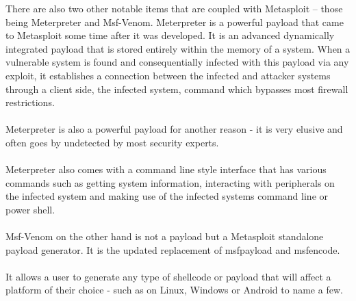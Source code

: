 \documentclass[a4paper, 12pt, titlepage]{report}
\begin{document}
There are also two other notable items that are coupled with Metasploit – those being Meterpreter and Msf-Venom. Meterpreter is a powerful payload that came to Metasploit some time after it was developed. It is an advanced dynamically integrated payload that is stored entirely within the memory of a system. \cite{testIDS}When a vulnerable system is found and consequentially infected with this payload via any exploit, it establishes a connection between the infected and attacker systems through a client side, the infected system, command which bypasses most firewall restrictions.\cite{testIDS}
\\\\
Meterpreter is also a powerful payload for another reason - it is very elusive and often goes by undetected by most security experts.\cite{testIDS}
\\\\
Meterpreter also comes with a command line style interface that has various commands such as getting system information, interacting with peripherals on the infected system and making use of the infected systems command line or power shell. 
\\\\
Msf-Venom on the other hand is not a payload but a Metasploit standalone payload generator. It is the updated replacement of msfpayload and msfencode.\cite{goodDef}
\\\\
It allows a user to generate any type of shellcode or payload that will affect a platform of their choice - such as on Linux, Windows or Android to name a few.\cite{goodDef}
\end{document}
